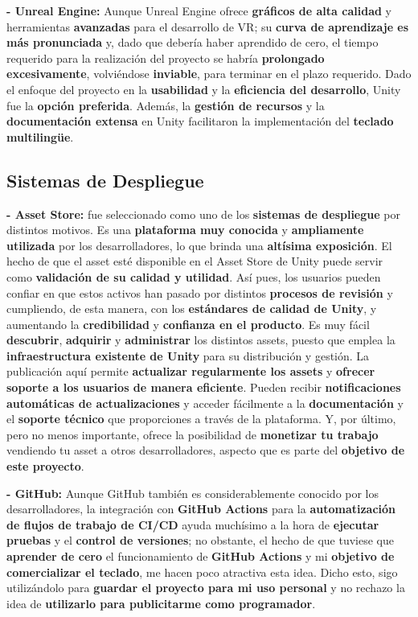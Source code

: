 \textbf{- Unreal Engine:} Aunque Unreal Engine ofrece \textbf{gráficos de alta calidad} y herramientas \textbf{avanzadas} para el desarrollo de VR; su \textbf{curva de aprendizaje es más pronunciada} y, dado que debería haber aprendido de cero, el tiempo requerido para la realización del proyecto se habría \textbf{prolongado excesivamente}, volviéndose \textbf{inviable}, para terminar en el plazo requerido. Dado el enfoque del proyecto en la \textbf{usabilidad} y la \textbf{eficiencia del desarrollo}, Unity fue la \textbf{opción preferida}. Además, la \textbf{gestión de recursos} y la \textbf{documentación extensa} en Unity facilitaron la implementación del \textbf{teclado multilingüe}.

\subsection{Sistemas de Despliegue}

\textbf{- Asset Store:} fue seleccionado como uno de los \textbf{sistemas de despliegue} por distintos motivos. Es una \textbf{plataforma muy conocida} y \textbf{ampliamente utilizada} por los desarrolladores, lo que brinda una \textbf{altísima exposición}. El hecho de que el asset esté disponible en el Asset Store de Unity puede servir como \textbf{validación de su calidad y utilidad}. Así pues, los usuarios pueden confiar en que estos activos han pasado por distintos \textbf{procesos de revisión} y cumpliendo, de esta manera, con los \textbf{estándares de calidad de Unity}, y aumentando la \textbf{credibilidad} y \textbf{confianza en el producto}. Es muy fácil \textbf{descubrir}, \textbf{adquirir} y \textbf{administrar} los distintos assets, puesto que emplea la \textbf{infraestructura existente de Unity} para su distribución y gestión. La publicación aquí permite \textbf{actualizar regularmente los assets} y \textbf{ofrecer soporte a los usuarios de manera eficiente}. Pueden recibir \textbf{notificaciones automáticas de actualizaciones} y acceder fácilmente a la \textbf{documentación} y el \textbf{soporte técnico} que proporciones a través de la plataforma. Y, por último, pero no menos importante, ofrece la posibilidad de \textbf{monetizar tu trabajo} vendiendo tu asset a otros desarrolladores, aspecto que es parte del \textbf{objetivo de este proyecto}.

\textbf{- GitHub:} Aunque GitHub también es considerablemente conocido por los desarrolladores, la integración con \textbf{GitHub Actions} para la \textbf{automatización de flujos de trabajo de CI/CD} ayuda muchísimo a la hora de \textbf{ejecutar pruebas} y el \textbf{control de versiones}; no obstante, el hecho de que tuviese que \textbf{aprender de cero} el funcionamiento de \textbf{GitHub Actions} y mi \textbf{objetivo de comercializar el teclado}, me hacen poco atractiva esta idea. Dicho esto, sigo utilizándolo para \textbf{guardar el proyecto para mi uso personal} y no rechazo la idea de \textbf{utilizarlo para publicitarme como programador}.



